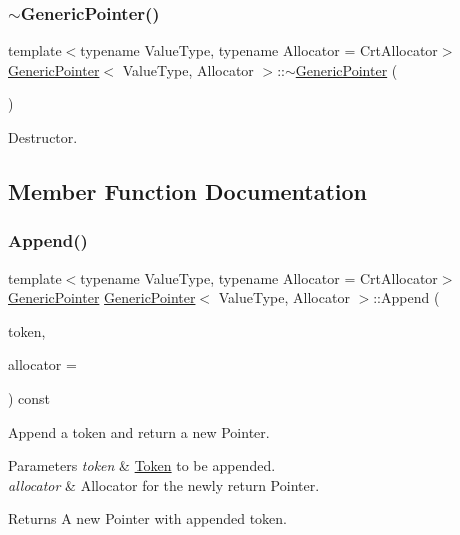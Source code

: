 \subsubsection{\texorpdfstring{$\sim$\+Generic\+Pointer()}{~GenericPointer()}}
{\footnotesize\ttfamily template$<$typename Value\+Type, typename Allocator = Crt\+Allocator$>$ \\
\hyperlink{classGenericPointer}{Generic\+Pointer}$<$ Value\+Type, Allocator $>$\+::$\sim$\hyperlink{classGenericPointer}{Generic\+Pointer} (\begin{DoxyParamCaption}{ }\end{DoxyParamCaption})\hspace{0.3cm}{\ttfamily [inline]}}



Destructor. 



\subsection{Member Function Documentation}
\mbox{\label{classGenericPointer_aa8f86c0f330807f337351a95ae254b78}} 
\subsubsection{\texorpdfstring{Append()}{Append()}\hspace{0.1cm}{\footnotesize\ttfamily [1/2]}}
{\footnotesize\ttfamily template$<$typename Value\+Type, typename Allocator = Crt\+Allocator$>$ \\
\hyperlink{classGenericPointer}{Generic\+Pointer} \hyperlink{classGenericPointer}{Generic\+Pointer}$<$ Value\+Type, Allocator $>$\+::Append (\begin{DoxyParamCaption}\item[{const \hyperlink{structGenericPointer_1_1Token}{Token} \&}]{token,  }\item[{Allocator $\ast$}]{allocator = {} }\end{DoxyParamCaption}) const\hspace{0.3cm}{\ttfamily [inline]}}



Append a token and return a new Pointer. 


\begin{DoxyParams}{Parameters}
{\em token} & \hyperlink{structGenericPointer_1_1Token}{Token} to be appended. \\
\hline
{\em allocator} & Allocator for the newly return Pointer. \\
\hline
\end{DoxyParams}
\begin{DoxyReturn}{Returns}
A new Pointer with appended token. 
\end{DoxyReturn}
\mbox{\label{classGenericPointer_a9f8a1711f5b8e0d951c25c6c65326f77}} 
